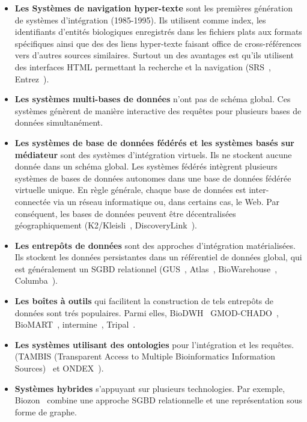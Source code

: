 \begin{itemize}
 
 \item \textbf{Les Systèmes de navigation hyper-texte} sont les premières génération de systèmes d'intégration (1985-1995). Ils utilisent comme index, les identifiants d'entités biologiques enregistrés dans les fichiers plats aux formats spécifiques ainsi que des des liens hyper-texte faisant office de cross-références vers d'autres sources similaires. Surtout un des avantages est qu'ils utilisent des interfaces HTML permettant la recherche et la navigation (SRS~\cite{srs}, Entrez~\cite{entrez}). \\
 
 \item \textbf{Les systèmes multi-bases de données} n'ont pas de schéma global. Ces systèmes génèrent de manière interactive des requêtes pour plusieurs bases de données simultanément. \\
 
 \item \textbf{Les systèmes de base de données fédérés et les systèmes basés sur médiateur} sont des systèmes d'intégration virtuels. Ils ne stockent aucune donnée dans un schéma global. Les systèmes fédérés intègrent plusieurs systèmes de bases de données autonomes dans une base de données fédérée virtuelle unique. En règle générale, chaque base de données est inter-connectée via un réseau informatique ou, dans certains cas, le Web. Par conséquent, les bases de données peuvent être décentralisées géographiquement (K2/Kleisli~\cite{k2kleisli}, DiscoveryLink~\cite{discoverylink}).\\
 
 \item \textbf{Les entrepôts de données} sont des approches d'intégration matérialisées. Ils stockent les données persistantes dans un référentiel de données global, qui est généralement un SGBD relationnel (GUS~\cite{k2kleisli}, Atlas~\cite{atlas}, BioWarehouse~\cite{biowarehouse}, Columba~\cite{columba}).\\
 
\item \textbf{Les boîtes à outils} qui facilitent la construction de tels entrepôts de données sont trés populaires. Parmi elles, BioDWH~\cite{biodwh} GMOD-CHADO~\cite{chado_2006}, BioMART~\cite{biomart2009}, intermine~\cite{intermine_2012}, Tripal~\cite{tripal_2011,tripal_2013,tripal_2018}.\\

 \item \textbf{Les systèmes utilisant des ontologies} pour l'intégration et les requêtes. (TAMBIS (Transparent Access to Multiple Bioinformatics Information Sources)~\cite{tambis} et ONDEX~\cite{ondex_2006,ondex_2011,Taubert2014}).\\
 
 \item \textbf{Systèmes hybrides} s'appuyant sur plusieurs technologies. Par exemple, Biozon~\cite{biozon2006} combine une approche SGBD relationnelle et une représentation sous forme de graphe.\\
  
\end{itemize}

